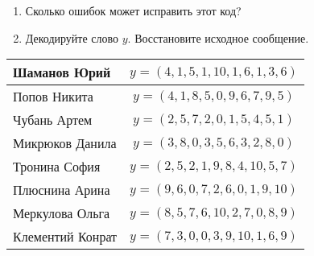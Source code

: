 \documentclass[12pt,a4paper]{scrartcl}
\begin{document}
{\begin{enumerate}
	\item Сколько ошибок может исправить этот код?
	\item Декодируйте слово $y$. Восстановите исходное сообщение.
\end{enumerate}

\def\arraystretch{1.5}
\setlength{\tabcolsep}{15pt}
\begin{tabular}{l  | c }
	Шаманов Юрий    & $y=(4, 1, 5, 1, 10, 1, 6, 1, 3, 6)$\\ \hline
	Попов Никита &  $y=(4, 1, 8, 5, 0, 9, 6, 7, 9, 5)$\\  \hline
	Чубань Артем &  $y=(2, 5, 7, 2, 0, 1, 5, 4, 5, 1)$\\  \hline
	Микрюков Данила   & $y = (3, 8, 0, 3, 5, 6, 3, 2, 8, 0)$\\  \hline
	Тронина София & $y=(2, 5, 2, 1, 9, 8, 4, 10, 5, 7)$ \\  \hline
	Плюснина Арина &  $y=(9, 6, 0, 7, 2, 6, 0, 1, 9, 10)$\\  \hline
	Меркулова Ольга & $y = (8, 5, 7, 6, 10, 2, 7, 0, 8, 9)$ \\  \hline
	Клементий Конрат & $y=(7, 3, 0, 0, 3, 9, 10, 1, 6, 9)$\\  \hline
\end{tabular}

}
\end{document}
